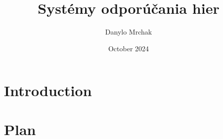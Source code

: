 \documentclass{article}
\title{Systémy odporúčania hier}
\author{Danylo Mrchak}
\date{October 2024}
\begin{document}
\maketitle

\section{Introduction}
\section{Plan}
\end{document}
